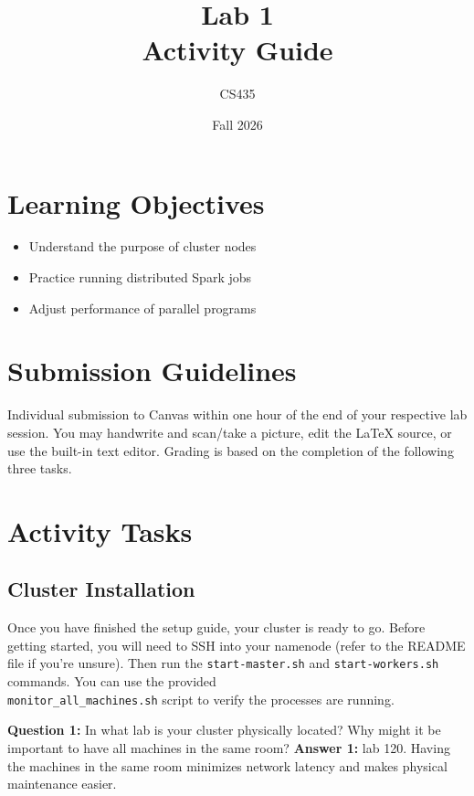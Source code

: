 \documentclass[11pt,letterpaper]{article}
\begin{document}
\title{Lab 1\\Activity Guide}
\author{CS435}
\date{Fall 2026}
\maketitle

\section{Learning Objectives}

\begin{itemize}
    \item Understand the purpose of cluster nodes
    \item Practice running distributed Spark jobs
    \item Adjust performance of parallel programs
\end{itemize}

\section{Submission Guidelines}

Individual submission to Canvas within one hour of the end of your respective lab session. You may handwrite and scan/take a picture, edit the \LaTeX \hspace{0.25em} source, or use the built-in text editor. Grading is based on the completion of the following three tasks.

\section{Activity Tasks}

\subsection{Cluster Installation}

Once you have finished the setup guide, your cluster is ready to go. Before getting started, you will need to SSH into your namenode (refer to the README file if you're unsure). Then run the \texttt{start-master.sh} and \texttt{start-workers.sh} commands. You can use the provided \\\texttt{monitor\_all\_machines.sh} script to verify the processes are running.
\newpage

\noindent
\textbf{Question 1:} In what lab is your cluster physically located? Why might it be important to have all machines in the same room?
\textbf{Answer 1:} lab 120. Having the machines in the same room minimizes network latency and makes physical maintenance easier.
\vspace{1in}
\end{document}
